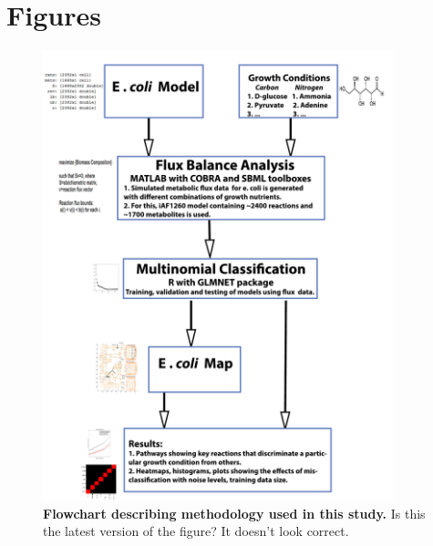 \documentclass[12pt]{article}
\begin{document}
\clearpage

\section*{Figures}

\begin{figure}[!ht]
\centerline{\includegraphics[width=4in]{Figures/flowchart_new.pdf}}
\caption{\label{fig:flowchart}\textbf{Flowchart describing methodology used in this study.} {\color{red}Is this the latest version of the figure? It doesn't look correct.}}
\end{figure}
\end{document}
